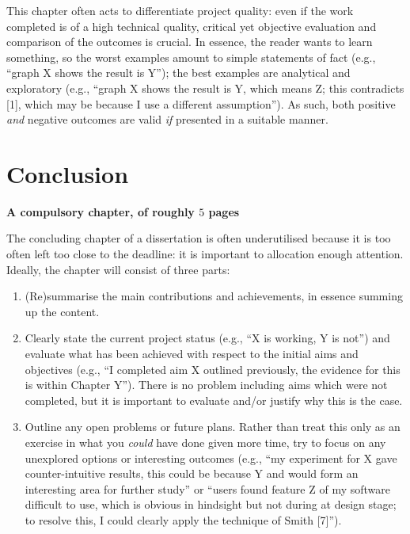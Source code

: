 \documentclass[ %
                    author={Tom Jager},
                supervisor={Dr. Daniel Schien},
                    degree={MEng},
                     title={A Bayesian Inference Engine for UMIS Structured Data},
                  subtitle={},
                      type={research},
                      year={2019} ]{dissertation}
\begin{document}
\noindent
This chapter often acts to differentiate project quality: even if the work
completed is of a high technical quality, critical yet objective evaluation 
and comparison of the outcomes is crucial.  In essence, the reader wants to
learn something, so the worst examples amount to simple statements of fact 
(e.g., ``graph X shows the result is Y''); the best examples are analytical 
and exploratory (e.g., ``graph X shows the result is Y, which means Z; this 
contradicts [1], which may be because I use a different assumption'').  As 
such, both positive {\em and} negative outcomes are valid {\em if} presented 
in a suitable manner.


\chapter{Conclusion}
\label{chap:conclusion}

{\bf A compulsory chapter,     of roughly $5$ pages} 
\vspace{1cm} 

\noindent
The concluding chapter of a dissertation is often underutilised because it 
is too often left too close to the deadline: it is important to allocation
enough attention.  Ideally, the chapter will consist of three parts:

\begin{enumerate}
\item (Re)summarise the main contributions and achievements, in essence
      summing up the content.
\item Clearly state the current project status (e.g., ``X is working, Y 
      is not'') and evaluate what has been achieved with respect to the 
      initial aims and objectives (e.g., ``I completed aim X outlined 
      previously, the evidence for this is within Chapter Y'').  There 
      is no problem including aims which were not completed, but it is 
      important to evaluate and/or justify why this is the case.
\item Outline any open problems or future plans.  Rather than treat this
      only as an exercise in what you {\em could} have done given more 
      time, try to focus on any unexplored options or interesting outcomes
      (e.g., ``my experiment for X gave counter-intuitive results, this 
      could be because Y and would form an interesting area for further 
      study'' or ``users found feature Z of my software difficult to use,
      which is obvious in hindsight but not during at design stage; to 
      resolve this, I could clearly apply the technique of Smith [7]'').
\end{enumerate}
\end{document}
